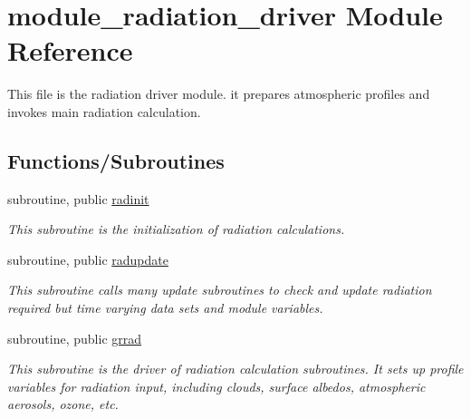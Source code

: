 \hypertarget{namespacemodule__radiation__driver}{}\section{module\+\_\+radiation\+\_\+driver Module Reference}
\label{namespacemodule__radiation__driver}


This file is the radiation driver module. it prepares atmospheric profiles and invokes main radiation calculation.  


\subsection*{Functions/\+Subroutines}
{\bf }\par
\begin{DoxyCompactItemize}
\item 
subroutine, public \hyperlink{namespacemodule__radiation__driver_af039e0c23dc6ab8d2f8b1c1c796ac0da}{radinit}                                                                                             
\begin{DoxyCompactList}\small\item\em This subroutine is the initialization of radiation calculations. \end{DoxyCompactList}\end{DoxyCompactItemize}

{\bf }\par
\begin{DoxyCompactItemize}
\item 
subroutine, public \hyperlink{namespacemodule__radiation__driver_a47f0e4defe607fbfc751f6c9274f459a}{radupdate}                                                                                         
\begin{DoxyCompactList}\small\item\em This subroutine calls many update subroutines to check and update radiation required but time varying data sets and module variables. \end{DoxyCompactList}\end{DoxyCompactItemize}

{\bf }\par
\begin{DoxyCompactItemize}
\item 
subroutine, public \hyperlink{namespacemodule__radiation__driver_a8285cf6a4d2e1ed25b0afff8e269ec63}{grrad}                                                                                                 
\begin{DoxyCompactList}\small\item\em This subroutine is the driver of radiation calculation subroutines. It sets up profile variables for radiation input, including clouds, surface albedos, atmospheric aerosols, ozone, etc. \end{DoxyCompactList}\end{DoxyCompactItemize}

